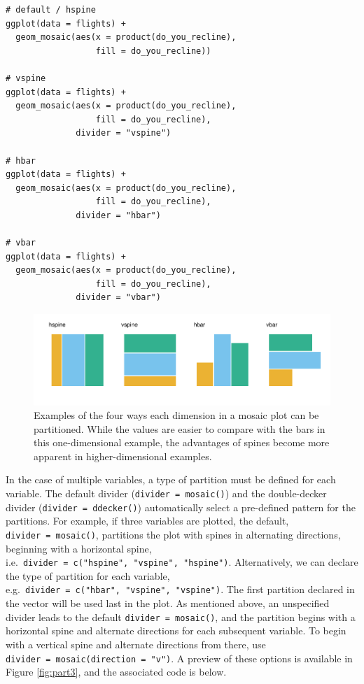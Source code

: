 \begin{verbatim}
# default / hspine
ggplot(data = flights) + 
  geom_mosaic(aes(x = product(do_you_recline), 
                  fill = do_you_recline))

# vspine
ggplot(data = flights) + 
  geom_mosaic(aes(x = product(do_you_recline), 
                  fill = do_you_recline), 
              divider = "vspine") 

# hbar
ggplot(data = flights) + 
  geom_mosaic(aes(x = product(do_you_recline), 
                  fill = do_you_recline), 
              divider = "hbar") 

# vbar
ggplot(data = flights) + 
  geom_mosaic(aes(x = product(do_you_recline), 
                  fill = do_you_recline), 
              divider = "vbar") 
\end{verbatim}

\begin{figure}[h]

{\centering \includegraphics[width=1\linewidth]{RJ-2023-013_files/figure-latex/part1-1} 

}

\caption{Examples of the four ways each dimension in a mosaic plot can be partitioned. While the values are easier to compare with the bars in this one-dimensional example, the advantages of spines become more apparent in higher-dimensional examples.}\label{fig:part1}
\end{figure}

In the case of multiple variables, a type of partition must be defined for each variable. The default divider (\texttt{divider\ =\ mosaic()}) and the double-decker divider (\texttt{divider\ =\ ddecker()}) automatically select a pre-defined pattern for the partitions. For example, if three variables are plotted, the default, \texttt{divider\ =\ mosaic()}, partitions the plot with spines in alternating directions, beginning with a horizontal spine, i.e.~\texttt{divider\ =\ c("hspine",\ "vspine",\ "hspine")}. Alternatively, we can declare the type of partition for each variable, e.g.~\texttt{divider\ =\ c("hbar",\ "vspine",\ "vspine")}. The first partition declared in the vector will be used last in the plot. As mentioned above, an unspecified divider leads to the default \texttt{divider\ =\ mosaic()}, and the partition begins with a horizontal spine and alternate directions for each subsequent variable. To begin with a vertical spine and alternate directions from there, use \texttt{divider\ =\ mosaic(direction\ =\ "v")}. A preview of these options is available in Figure \ref{fig:part3}, and the associated code is below.

